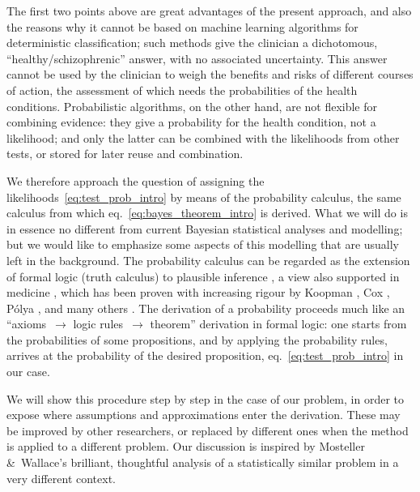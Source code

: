 \documentclass[%
]{frontiersSCNS-nologo} %
\newcommand*{\citey}{\citeyearpar}
\newcommand*{\eqn}{eq.}
\newcommand*{\amp}{\&}
\renewcommand*{\|}{\mathpunct{|}}%
\begin{document}
\bigskip

The first two points above are great advantages of the present approach,
and also the reasons why it cannot be based on  machine learning algorithms for deterministic classification; such methods give the
clinician a dichotomous, \enquote{healthy/schizophrenic} answer, with no
associated uncertainty. This answer cannot be used by the clinician to
weigh the benefits and risks of different courses of action, the assessment
of which needs the probabilities of the health conditions. Probabilistic
algorithms, on the other hand, are not flexible for combining evidence:
they give a probability for the health condition, not a likelihood; and
only the latter can be combined with the likelihoods from other tests, or
stored for later reuse and combination.

We therefore approach the question of assigning the
likelihoods~\eqref{eq:test_prob_intro} by means of the probability
calculus, the same calculus from which \eqn~\eqref{eq:bayes_theorem_intro}
is derived. What we will do is in essence no different from current
Bayesian statistical analyses and modelling; but we would like to emphasize
some aspects of this modelling that are usually left in the background. The
probability calculus can be regarded as the extension of formal logic
(truth calculus) to plausible
inference
\citep{jeffreys1939_r2003,jaynes1994_r2003,hailperin1996}, a view also
supported in medicine \citep{greenland1998,maclure1998,goodman1999}, which
has been proven with increasing rigour by Koopman
\citey{koopman1940,koopman1940b,koopman1941}, Cox
\citey{cox1946,cox1961,cox1979}, P\'olya
\citey{polya1949,polya1954b_r1968}, and many others
\citep{horvitzetal1986,paris1994_r2006,halpern1999b,snow1998,dupreetal2009,tereninetal2015_r2017}.
The derivation of a probability proceeds much like an
\enquote{axioms~$\rightarrow$ logic rules~$\rightarrow$ theorem} derivation
in formal logic: one starts from the probabilities of some propositions,
and by applying the probability rules, arrives at the probability of the
desired proposition, \eqn~\eqref{eq:test_prob_intro} in our case.

We will show this procedure step by step in the case of our
problem, in order to expose where assumptions and approximations enter
the derivation. These may be improved by other researchers, or replaced by
different ones when the method is applied to a different problem. Our
discussion is inspired by Mosteller \amp\ Wallace's
\citep{mostelleretal1963} brilliant, thoughtful analysis of a statistically
similar problem in a very different context.
\end{document}
